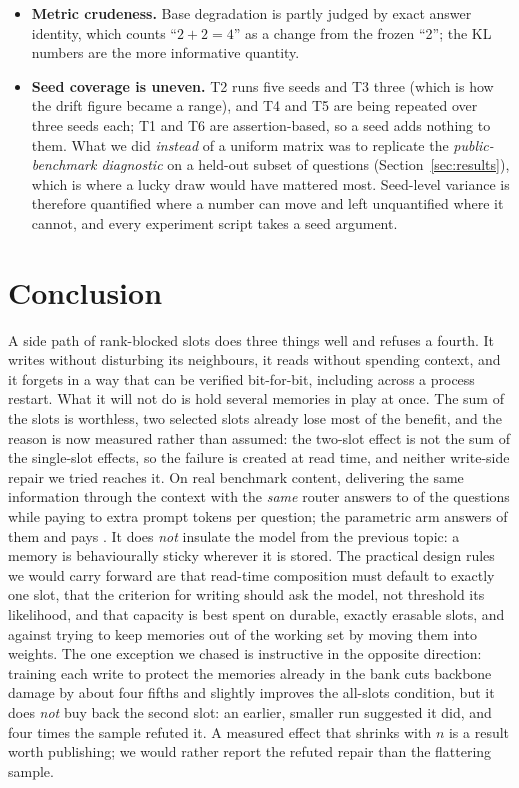 \documentclass[11pt]{article}
\begin{document}
\begin{itemize}
\item \textbf{Metric crudeness.} Base degradation is partly judged by exact
  answer identity, which counts ``$2+2=4$'' as a change from the frozen ``2'';
  the KL numbers are the more informative quantity.
\item \textbf{Seed coverage is uneven.} T2 runs five seeds and T3 three (which is how
  the drift figure became a range), and T4 and T5 are being repeated over three seeds
  each; T1 and T6 are assertion-based, so a seed adds nothing to
  them. What we did \emph{instead} of a uniform matrix was to replicate the
  \emph{public-benchmark diagnostic} on a held-out subset of questions
  (Section~\ref{sec:results}), which is where a lucky draw would have mattered most.
  Seed-level variance is therefore quantified where a number can move and left
  unquantified where it cannot, and every experiment script takes a seed argument.
\end{itemize}

\section{Conclusion}

A side path of rank-blocked slots does three things well and refuses a fourth. It writes
without disturbing its neighbours, it reads without spending context, and it forgets in a
way that can be verified bit-for-bit, including across a process restart. What it will not
do is hold several memories in play at once. The sum of the slots is worthless, two
selected slots already lose most of the benefit, and the reason is now measured rather
than assumed: the two-slot effect is not the sum of the single-slot effects, so the
failure is created at read time, and neither write-side repair we tried reaches it. On
real benchmark content, delivering the same information
through the context with the \emph{same} router answers \tJudgeContextTarget{} to
\tJudgeContextAll{} of the questions while paying \tTokContextTarget{} to
\tTokContextAll{} extra prompt tokens per question; the parametric arm answers
\tJudgeWeights{} of them and pays \tTokWeights{}. It does \emph{not} insulate the
model from the previous topic: a memory is behaviourally sticky wherever it is
stored. The practical design rules we would carry forward are that read-time
composition must default to exactly one slot, that the criterion for writing should
ask the model, not threshold its likelihood, and that capacity is best spent
on durable, exactly erasable slots, and against trying to keep memories out of the
working set by moving them into weights. The one exception we chased is instructive
in the opposite direction: training each write to protect the memories already in the
bank cuts backbone damage by about four fifths and slightly improves the all-slots
condition, but it does \emph{not} buy back the second slot: an earlier, smaller run suggested it did, and four times the sample refuted it. A measured effect that
shrinks with $n$ is a result worth publishing; we would rather report the refuted
repair than the flattering sample.
\end{document}
